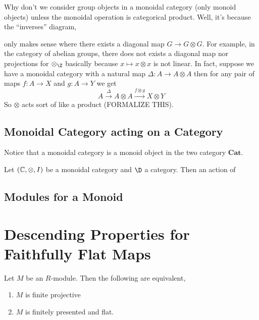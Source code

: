 \documentclass[12pt]{article}
\begin{document}
Why don't we consider group objects in a monoidal category (only monoid objects) unless the monoidal operation is categorical product. Well, it's because the ``inverses'' diagram,
\begin{center}
\end{center}
only makes sense where there exists a diagonal map $G \to G \otimes G$. For example, in the category of abelian groups, there does not exists a diagonal map nor projections for $\otimes_\Z$ basically because $x \mapsto x \otimes x$ is not linear. In fact, suppose we have a monoidal category with a natural map $\Delta : A \to A \otimes A$ then for any pair of maps $f : A \to X$ and $g : A \to Y$ we get 
\[ A \xrightarrow{\Delta} A \otimes A \xrightarrow{f \otimes g} X \otimes Y \] 
So $\otimes$ acts sort of like a product (FORMALIZE THIS).

\subsection{Monoidal Category acting on a Category}

\begin{rmk}
Notice that a monoidal category is a monoid object in the two category $\mathbf{Cat}$.
\end{rmk}

\begin{defn}
Let $(\mathbb{C}, \otimes, I)$ be a monoidal category and $\D$ a category. Then an action of 
\end{defn}

\subsection{Modules for a Monoid}

\section{Descending Properties for Faithfully Flat Maps}

\begin{lemma}
Let $M$ be an $R$-module. Then the following are equivalent,
\begin{enumerate}
\item $M$ is finite projective
\item $M$ is finitely presented and flat.
\end{enumerate}
\end{lemma}
\end{document}
